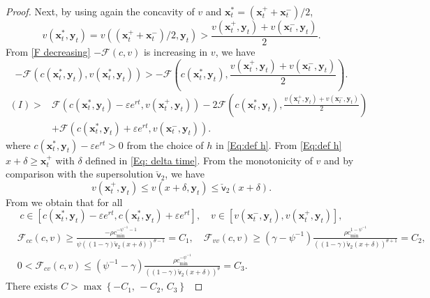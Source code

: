 \documentclass[11pt]{article}
\numberwithin{equation}{section}
\theoremstyle{definition}
\def\sv{{\mathsf{v}}}
\newcommand{\eps}{\varepsilon}
\newcommand{\beq}{\begin{equation}}
\newcommand{\eeq}{\end{equation}}
\newcommand{\g}{\gamma}
\newcommand{\p}{\psi}
\newcommand{\lc}{\left(}
\newcommand{\rc}{\right)}
\theoremstyle{plain}
\begin{document}
\begin{proof}
Next, by using again the concavity of $v$ and $\boldsymbol{x}^*_t=(\boldsymbol{x}^+_t+\boldsymbol{x}^-_t)/2$, 
$$
v\lc \boldsymbol{x}^*_t,\boldsymbol{y}_t\rc=v\lc (\boldsymbol{x}^+_t+\boldsymbol{x}^-_t)/2,\boldsymbol{y}_t\rc>\frac{ v\lc \boldsymbol{x}^+_t,\boldsymbol{y}_t\rc+ v\lc \boldsymbol{x}^-_t,\boldsymbol{y}_t\rc}{2}.
$$
From \eqref{F decreasing} $-\mathcal{F}(c,v)$ is increasing in $v$, we have 
$$
 -\mathcal{F}\lc c\lc \boldsymbol{x}^*_t,\boldsymbol{y}_t\rc, v\lc \boldsymbol{x}^*_t,\boldsymbol{y}_t\rc \rc> -\mathcal{F}\lc c\lc \boldsymbol{x}^*_t,\boldsymbol{y}_t\rc, \frac{ v\lc \boldsymbol{x}^+_t,\boldsymbol{y}_t\rc+ v\lc \boldsymbol{x}^-_t,\boldsymbol{y}_t\rc}{2}\rc.
$$
$$
\begin{aligned}
 (I)>{}&\mathcal{F}\lc c\lc \boldsymbol{x}^*_t,\boldsymbol{y}_t\rc-\eps e^{rt}, v\lc \boldsymbol{x}^+_t,\boldsymbol{y}_t\rc\rc -2\mathcal{F}\lc c\lc \boldsymbol{x}^*_t,\boldsymbol{y}_t\rc, \frac{ v\lc \boldsymbol{x}^+_t,\boldsymbol{y}_t\rc+ v\lc \boldsymbol{x}^-_t,\boldsymbol{y}_t\rc}{2}\rc\\
&+\mathcal{F}\lc c\lc \boldsymbol{x}^*_t,\boldsymbol{y}_t\rc+\eps e^{rt}, v\lc \boldsymbol{x}^-_t,\boldsymbol{y}_t\rc\rc.
\end{aligned}
$$
where $c\lc \boldsymbol{x}^*_t,\boldsymbol{y}_t\rc-\eps e^{rt}>0$ from the choice of $h$ in \eqref{Eq:def h}. From \eqref{Eq:def h} $x+\delta\geq \boldsymbol{x}^+_t$ with $\delta$ defined in \eqref{Eq: delta time}. From the monotonicity of $v$ and by comparison with the supersolution  $\check{\sv}_2$, we have
$$
v\lc \boldsymbol{x}^+_t,\boldsymbol{y}_t\rc \leq 
v\lc x+\delta, \boldsymbol{y}_t\rc \leq \check{\sv}_2(x+\delta).
$$
From  we obtain that for all 
\beq\label{Eq: (c,v)}
c\in [c\lc \boldsymbol{x}^*_t,\boldsymbol{y}_t\rc-\eps e^{rt},c\lc \boldsymbol{x}^*_t,\boldsymbol{y}_t\rc+\eps e^{rt}],\quad v\in [v\lc \boldsymbol{x}^-_t,\boldsymbol{y}_t\rc,v\lc \boldsymbol{x}^+_t,\boldsymbol{y}_t\rc],
\eeq
$$
\begin{aligned}
&\mathcal{F}_{cc}(c,v)\geq \frac{-\rho c_{\min}^{-\p^{-1}-1}}{\psi((1-\g)\check{\sv}_2(x+\delta))^{\theta-1}}=C_1,\quad \mathcal{F}_{vv}(c,v)\geq (\g-\psi^{-1})\frac{\rho c_{\min}^{1-\p^{-1}}}{((1-\g)\check{\sv}_2(x+\delta))^{\theta+1}}=C_2,\\
&0<\mathcal{F}_{cv}(c,v) \leq (\psi^{-1}-\g)\frac{\rho c_{\min}^{-\p^{-1}}}{((1-\g)\check{\sv}_2(x+\delta))^{\theta}}=C_3.
\end{aligned}
$$
{}{There exists 
$
C>\max\left\{-C_1,\,-C_2,\,C_3\right\}
$
}
\end{proof}
\end{document}

